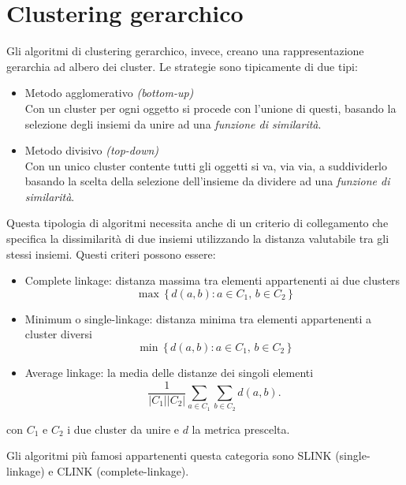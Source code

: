 \section{Clustering gerarchico}
	Gli algoritmi di clustering gerarchico, invece, creano una rappresentazione gerarchia ad albero dei cluster.
	Le strategie sono tipicamente di due tipi: 
	\begin{itemize}
		\item Metodo agglomerativo \emph{(bottom-up)} \\
		Con un cluster per ogni oggetto si procede con l'unione di questi, basando la selezione degli insiemi da unire ad una \emph{funzione di similarità}.

		\item Metodo divisivo \emph{(top-down)} \\
		Con un unico cluster contente tutti gli oggetti si va, via via, a suddividerlo basando la scelta della selezione dell'insieme da dividere ad una \emph{funzione di similarità}. 		
	\end{itemize}

	Questa tipologia di algoritmi necessita anche di un criterio di collegamento che specifica la dissimilarità di due insiemi utilizzando la distanza valutabile tra gli stessi insiemi. Questi criteri possono essere: 
	\begin{itemize}
		\item Complete linkage: distanza massima tra elementi appartenenti ai due clusters
			\begin{equation*}
				\max \, \{\, d(a,b) : a \in C_1,\, b \in C_2 \,\}
			\end{equation*}
		\item Minimum o single-linkage: distanza minima tra elementi appartenenti a cluster diversi
			\begin{equation*}
			 	\min \, \{\, d(a,b) : a \in C_1,\, b \in C_2 \,\}
			\end{equation*}

		\item Average linkage: la media delle distanze dei singoli elementi
			\begin{equation*}
				\frac{1}{|C_1| |C_2|} \sum_{a \in C_1 }\sum_{ b \in C_2} d(a,b). 
			\end{equation*}
	\end{itemize}
	con $C_1$ e $C_2$ i due cluster da unire e $d$ la metrica prescelta.

	Gli algoritmi più famosi appartenenti questa categoria sono SLINK (single-linkage) e CLINK (complete-linkage)\cite{clustering_gerarchico}.
